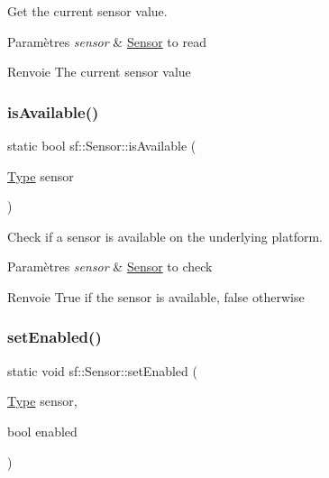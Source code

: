 Get the current sensor value. 


\begin{DoxyParams}{Paramètres}
{\em sensor} & \hyperlink{classsf_1_1Sensor}{Sensor} to read\\
\hline
\end{DoxyParams}
\begin{DoxyReturn}{Renvoie}
The current sensor value 
\end{DoxyReturn}
\mbox{\label{classsf_1_1Sensor_a7b7a2570218221781233bd495323abf0}} 
\subsubsection{\texorpdfstring{is\+Available()}{isAvailable()}}
{\footnotesize\ttfamily static bool sf\+::\+Sensor\+::is\+Available (\begin{DoxyParamCaption}\item[{\hyperlink{classsf_1_1Sensor_a687375af3ab77b818fca73735bcaea84}{Type}}]{sensor }\end{DoxyParamCaption})\hspace{0.3cm}{\ttfamily [static]}}



Check if a sensor is available on the underlying platform. 


\begin{DoxyParams}{Paramètres}
{\em sensor} & \hyperlink{classsf_1_1Sensor}{Sensor} to check\\
\hline
\end{DoxyParams}
\begin{DoxyReturn}{Renvoie}
True if the sensor is available, false otherwise 
\end{DoxyReturn}
\mbox{\label{classsf_1_1Sensor_afb31c5697d2e0a5fec70d702ec1d6cd9}} 
\subsubsection{\texorpdfstring{set\+Enabled()}{setEnabled()}}
{\footnotesize\ttfamily static void sf\+::\+Sensor\+::set\+Enabled (\begin{DoxyParamCaption}\item[{\hyperlink{classsf_1_1Sensor_a687375af3ab77b818fca73735bcaea84}{Type}}]{sensor,  }\item[{bool}]{enabled }\end{DoxyParamCaption})\hspace{0.3cm}{\ttfamily [static]}}




